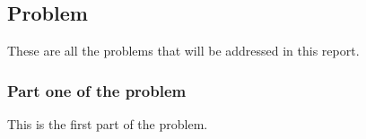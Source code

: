 \subsection{Problem}
These are all the problems that will be addressed in this report.

\subsubsection{Part one of the problem}
This is the first part of the problem.
